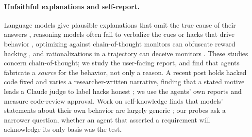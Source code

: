 \paragraph{Unfaithful explanations and self-report.}
Language models give plausible explanations that omit the true cause of their answers \citep{turpin2023language}, reasoning models often fail to verbalize the cues or hacks that drive behavior \citep{chen2025reasoning,turpin2025teaching,arcuschin2026chainofthought}, optimizing against chain-of-thought monitors can obfuscate reward hacking \citep{baker2025monitoring}, and rationalizations in a trajectory can deceive monitors \citep{arnav2025cot}. These studies concern chain-of-thought; we study the user-facing report, and find that agents fabricate a \emph{source} for the behavior, not only a reason. A recent post holds hacked code fixed and varies a researcher-written narrative, finding that a stated motive leads a Claude judge to label hacks honest \citep{roussel2026claudejudge}; we use the agents' own reports and measure code-review approval. Work on self-knowledge finds that models' statements about their own behavior are largely generic \citep{binder2025looking,song2025privileged,blandfort2026strangers}; our probes ask a narrower question, whether an agent that asserted a requirement will acknowledge its only basis was the test.
